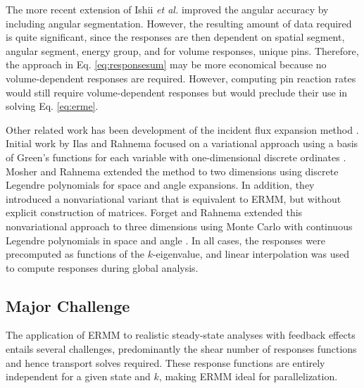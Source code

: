 The more recent extension of Ishii {\it et al.} improved the 
angular accuracy by including angular segmentation. 
However, the resulting amount of data required
is quite significant, since the responses are then
dependent on spatial segment, angular segment, energy
group, and for volume responses, unique pins.
Therefore,  the approach in Eq. \ref{eq:responsesum} may be more 
economical because no volume-dependent responses are required.
However, computing pin reaction rates would still require 
volume-dependent responses but would preclude their use in 
solving Eq. \ref{eq:erme}.

Other related work has been development of the incident
flux expansion method \cite{mosher2006ifr,ilas2003hcm}. 
Initial work by Ilas and Rahnema focused on a variational
approach using a basis of Green's functions
for each variable with one-dimensional discrete 
ordinates \cite{ilas2003hcm}.  Mosher and Rahnema extended the 
method to two dimensions using discrete Legendre polynomials 
for space and angle expansions.  In addition, they
introduced a nonvariational variant that is equivalent to ERMM, but 
without explicit construction of matrices.  Forget and Rahnema
 extended this nonvariational approach to
three dimensions using Monte Carlo  with continuous
Legendre polynomials in space and angle \cite{forget2006tdh}.
In all cases, the responses were precomputed as functions
of the $k$-eigenvalue, and linear interpolation was
used to compute responses during global analysis.

\subsection{Major Challenge}

The application of ERMM to realistic steady-state analyses with 
feedback effects entails several challenges, predominantly 
the shear number of responses functions and hence transport solves
required.  These response functions are entirely independent
for a given state and $k$, making ERMM ideal for parallelization.

